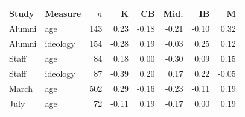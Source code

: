 \begin{tabular}{llrrrrrr}
\toprule
Study & Measure & $n$ & K & CB & Mid. & IB & M \\
\midrule
Alumni & age & 143 & 0.23 & -0.18 & -0.21 & -0.10 & 0.32 \\
Alumni & ideology & 154 & -0.28 & 0.19 & -0.03 & 0.25 & 0.12 \\
Staff & age &  84 & 0.18 & 0.00 & -0.30 & 0.09 & 0.15 \\
Staff & ideology &  87 & -0.39 & 0.20 & 0.17 & 0.22 & -0.05 \\
March & age & 502 & 0.29 & -0.16 & -0.23 & -0.11 & 0.19 \\
July & age &  72 & -0.11 & 0.19 & -0.17 & 0.00 & 0.19 \\
\bottomrule
\end{tabular}
